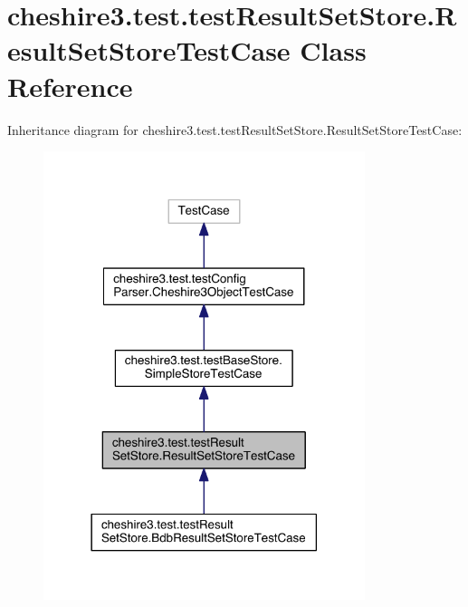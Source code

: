 \hypertarget{classcheshire3_1_1test_1_1test_result_set_store_1_1_result_set_store_test_case}{\section{cheshire3.\-test.\-test\-Result\-Set\-Store.\-Result\-Set\-Store\-Test\-Case Class Reference}
\label{classcheshire3_1_1test_1_1test_result_set_store_1_1_result_set_store_test_case}
}


Inheritance diagram for cheshire3.\-test.\-test\-Result\-Set\-Store.\-Result\-Set\-Store\-Test\-Case\-:
\nopagebreak
\begin{figure}[H]
\begin{center}
\leavevmode
\includegraphics[width=266pt]{classcheshire3_1_1test_1_1test_result_set_store_1_1_result_set_store_test_case__inherit__graph}
\end{center}
\end{figure}


